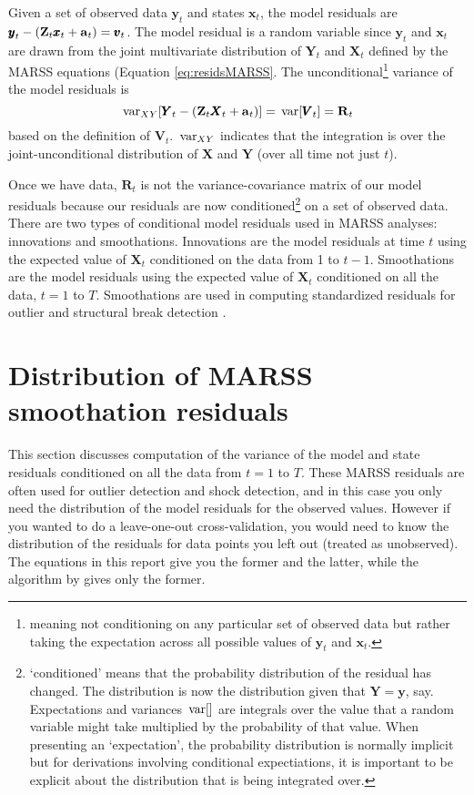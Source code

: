 \documentclass[]{article}
\def\XI{\mbox{\boldmath $\Xi$}}
\def\RR{\mbox{$\mathbf R$}}	 \def\rr{\mbox{$\mathbf r$}} \def\Rb{\mbox{$\mathbf H$}}	\def\Rm{\mathbb{R}}
\def\VV{\mbox{$\pmb{V}$}}	\def\vv{\mbox{$\pmb{v}$}}
\def\XX{\mbox{$\pmb{X}$}}	\def\xx{\mbox{$\pmb{x}$}}
\def\YY{\mbox{$\pmb{Y}$}}	\def\yy{\mbox{$\pmb{y}$}}
\def\ZZ{\mbox{$\mathbf Z$}}	\def\zz{\mbox{$\mathbf z$}}	\def\Zb{\mbox{$\mathbf M$}} \def\Za{\mbox{$\mathbf N$}} \def\Zm{\XI}
\def\var{\,\textup{\textrm{var}}}
\begin{document}
Given a set of observed data $\yy_t$ and states $\xx_t$, the model residuals are $\yy_t - (\ZZ_t \xx_t + \aa_t)=\vv_t$.  The model residual is a random variable since $\yy_t$ and $\xx_t$ are drawn from the joint multivariate distribution of $\YY_t$ and $\XX_t$ defined by the MARSS equations (Equation \ref{eq:residsMARSS}.
The unconditional\footnote{meaning not conditioning on any particular set of observed data but rather taking the expectation across all possible values of $\yy_t$ and $\xx_t$.} variance of the model residuals is
\begin{equation}\label{eqn:unconditiondistofVt}
\var_{XY}[\YY_t - (\ZZ_t \XX_t + \aa_t)] = \var[\VV_t] = \RR_t\\
\end{equation}
based on the definition of $\VV_t$.  $\var_{XY}$ indicates that the integration is over the joint-unconditional distribution of $\XX$ and $\YY$ (over all time not just $t$).

Once we have data, $\RR_t$ is not the variance-covariance matrix of our model residuals because our residuals are now conditioned\footnote{`conditioned' means that the probability distribution of the residual has changed. The distribution is now the distribution given that $\YY=\yy$, say. Expectations and variances $\var[ ]$ are integrals over the value that a random variable might take multiplied by the probability of that value. When presenting an   `expectation', the probability distribution is normally implicit but for derivations involving conditional expectiations, it is important to be explicit about the distribution that is being integrated over.} on a set of observed data. There are two types of conditional model residuals used in MARSS analyses: innovations and smoothations.  Innovations are the model residuals at time $t$ using the expected value of $\XX_t$ conditioned on the data from 1 to $t-1$.  Smoothations  are the model residuals using the expected value of $\XX_t$ conditioned on all the data, $t=1$ to $T$.  Smoothations are used in computing standardized residuals for outlier and structural break detection \citep{Harveyetal1998, deJongPenzer1998, CommandeurKoopman2007}.  

\section{Distribution of MARSS smoothation residuals}\label{sec:smoothations}

This section discusses computation of the variance of the model and state residuals conditioned on all the data from $t=1$ to $T$.  These MARSS residuals are often used for outlier detection and shock detection, and in this case you only need the distribution of the model residuals for the observed values.  However if you wanted to do a leave-one-out cross-validation, you would need to know the distribution of the residuals for data points you left out (treated as unobserved).  The equations in this report give you the former and the latter, while the algorithm by \citet{Harveyetal1998} gives only the former.
\end{document}
